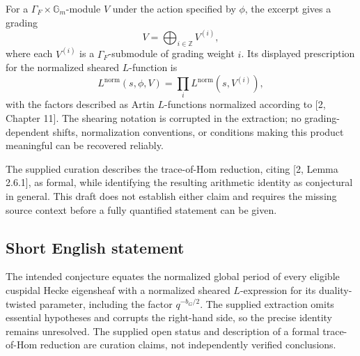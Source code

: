 \documentclass[11pt]{article}
\newcommand{\Z}{\mathbb{Z}}
\begin{document}
For a \(\Gamma_F\times\mathbb G_m\)-module \(V\) under the action specified by \(\phi\), the excerpt gives a grading
\[
 V=\bigoplus_{i\in\Z}V^{(i)},
\]
where each \(V^{(i)}\) is a \(\Gamma_F\)-submodule of grading weight \(i\). Its displayed prescription for the normalized sheared \(L\)-function is
\[
 L^{\mathrm{norm}}(s,\phi,V)
 =\prod_i L^{\mathrm{norm}}(s,V^{(i)}),
\]
with the factors described as Artin \(L\)-functions normalized according to [2, Chapter 11]. The shearing notation is corrupted in the extraction; no grading-dependent shifts, normalization conventions, or conditions making this product meaningful can be recovered reliably.

The supplied curation describes the trace-of-Hom reduction, citing [2, Lemma 2.6.1], as formal, while identifying the resulting arithmetic identity as conjectural in general. This draft does not establish either claim and requires the missing source context before a fully quantified statement can be given.
\subsection{Short English statement}
The intended conjecture equates the normalized global period of every eligible cuspidal Hecke eigensheaf with a normalized sheared \(L\)-expression for its duality-twisted parameter, including the factor \(q^{-b_G/2}\). The supplied extraction omits essential hypotheses and corrupts the right-hand side, so the precise identity remains unresolved. The supplied open status and description of a formal trace-of-Hom reduction are curation claims, not independently verified conclusions.
\end{document}
